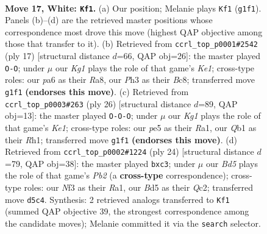 \documentclass[11pt]{article}
\begin{document}
\clearpage

\begin{figure}[p]\centering
\begin{subfigure}{0.46\textwidth}\centering
\resizebox{\linewidth}{!}{%
\newchessgame
\chessboard[
  setfen={r2q1b2/1bp1rppk/p1np4/1p1Bp2p/4P3/P2P1N1P/1PPBRPP1/RQ4K1 w - - 0 17},
  showmover=false,
  pgfstyle=straightmove, color=movearrow, markmove={g1-f1}
]}
\caption{}
\end{subfigure}\hfill
\begin{subfigure}{0.46\textwidth}\centering
\resizebox{\linewidth}{!}{%
\newchessgame
\chessboard[
  setfen={r1bqk2r/pp2pp1p/3p1np1/2p5/3bP3/1PN3P1/PBPP1PBP/R1Q1K2R b KQkq - 3 9},
  showmover=false,
  pgfstyle=straightmove, color=movearrow, markmove={e8-g8}
]}
\caption{}
\end{subfigure}
\\[4pt]
\begin{subfigure}{0.46\textwidth}\centering
\resizebox{\linewidth}{!}{%
\newchessgame
\chessboard[
  setfen={r4rk1/pp1bbqpp/2np1p2/4p3/8/1NP1B1P1/PPP1QPBP/R3K2R w KQ - 8 14},
  showmover=false,
  pgfstyle=straightmove, color=movearrow, markmove={e1-c1}
]}
\caption{}
\end{subfigure}\hfill
\begin{subfigure}{0.46\textwidth}\centering
\resizebox{\linewidth}{!}{%
\newchessgame
\chessboard[
  setfen={rn1q1rk1/pb2bpp1/1p5p/2pp4/3P4/P1nBPNB1/1PQ2PPP/R3K2R w KQ - 0 13},
  showmover=false,
  pgfstyle=straightmove, color=movearrow, markmove={b2-c3}
]}
\caption{}
\end{subfigure}
\caption{\textbf{Move 17, White: \texttt{Kf1}.} (a) Our position; Melanie plays \texttt{Kf1} (\texttt{g1f1}). Panels (b)--(d) are the retrieved master positions whose correspondence most drove this move (highest QAP objective among those that transfer to it). (b) Retrieved from \texttt{ccrl\_top\_p0001\#2542} (ply 17) [structural distance $d$=66, QAP obj=26]: the master played \texttt{O-O}; under $\mu$ our \emph{Kg1} plays the role of that game's \emph{Ke1}; cross-type roles: our \emph{p}a6 as their \emph{R}a8, our \emph{P}h3 as their \emph{B}c8; transferred move \texttt{g1f1} \textbf{(endorses this move)}. (c) Retrieved from \texttt{ccrl\_top\_p0003\#263} (ply 26) [structural distance $d$=89, QAP obj=13]: the master played \texttt{O-O-O}; under $\mu$ our \emph{Kg1} plays the role of that game's \emph{Ke1}; cross-type roles: our \emph{p}e5 as their \emph{R}a1, our \emph{Q}b1 as their \emph{R}h1; transferred move \texttt{g1f1} \textbf{(endorses this move)}. (d) Retrieved from \texttt{ccrl\_top\_p0002\#1224} (ply 24) [structural distance $d$=79, QAP obj=38]: the master played \texttt{bxc3}; under $\mu$ our \emph{Bd5} plays the role of that game's \emph{Pb2} (a \textbf{cross-type} correspondence); cross-type roles: our \emph{N}f3 as their \emph{R}a1, our \emph{B}d5 as their \emph{Q}c2; transferred move \texttt{d5c4}. Synthesis: 2 retrieved analogs transferred to \texttt{Kf1} (summed QAP objective 39, the strongest correspondence among the candidate moves); Melanie committed it via the \texttt{search} selector.}
\label{fig:thought-m32}
\end{figure}
\end{document}
